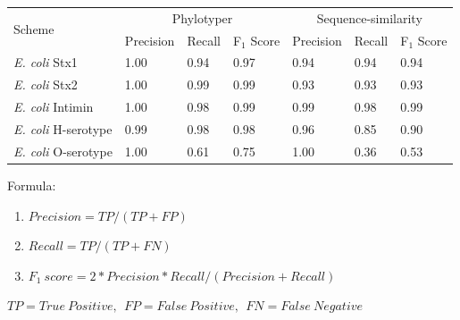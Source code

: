 \documentclass[12pt,letterpaper]{article}
\begin{document}
\begin{minipage}{\linewidth}
\medskip
\begin{tabular}{@{\extracolsep{2pt}}lllllll@{}}
\toprule 
\multirow{2}{*}{Scheme} & \multicolumn{3}{c}{Phylotyper} & \multicolumn{3}{c}{Sequence-similarity}\\
\cline{2-4}\cline{5-7}
& Precision & Recall & F$_{1}$ Score & Precision & Recall & F$_{1}$ Score \\
\midrule
{\it E. coli} Stx1 & 1.00 & 0.94 & 0.97 & 0.94 & 0.94 & 0.94\\
{\it E. coli} Stx2 & 1.00 & 0.99 & 0.99 & 0.93 & 0.93 & 0.93\\
{\it E. coli} Intimin & 1.00 & 0.98 & 0.99 & 0.99 & 0.98 & 0.99\\
{\it E. coli} H-serotype & 0.99 & 0.98 & 0.98 & 0.96 & 0.85 & 0.90\\
{\it E. coli} O-serotype & 1.00 & 0.61 & 0.75 & 1.00 & 0.36 & 0.53\\\bottomrule
\end{tabular}\par
\bigskip
Formula:
\begin{enumerate}
\item $Precision = TP / (TP + FP)$
\item $Recall = TP / (TP + FN)$
\item $F_{1}~score = 2*Precision*Recall/(Precision + Recall)$
\end{enumerate}
$TP = True~Positive,~~FP = False~Positive,~~FN = False~Negative$

\end{minipage}
\end{document}
